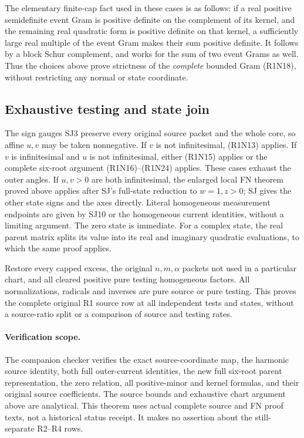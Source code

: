 The elementary finite-cap fact used in these cases is as follows:
if a real positive semidefinite event Gram is positive definite on
the complement of its kernel, and the remaining real quadratic
form is positive definite on that kernel, a sufficiently large
real multiple of the event Gram makes their sum positive definite.
It follows by a block Schur complement, and works for the sum of
two event Grams as well.  Thus the choices above prove strictness
of the \emph{complete} bounded Gram (R1N18), without restricting
any normal or state coordinate.

\subsection{Exhaustive testing and state join}

The sign gauges SJ3 preserve every original source packet and the
whole core, so affine $u,v$ may be taken nonnegative.
If $v$ is not infinitesimal, (R1N13) applies.
If $v$ is infinitesimal and $u$ is not infinitesimal, either
(R1N15) applies or the complete six-root argument
(R1N16)--(R1N24) applies.  These cases exhaust the outer angles.
If $u,v>0$ are both infinitesimal, the enlarged local FN theorem
proved above applies after SJ's full-state reduction to $w=1,z>0$;
SJ gives the other state signs and the axes directly.
Literal homogeneous measurement endpoints are given by SJ10 or
the homogeneous current identities, without a limiting argument.
The zero state is immediate.  For a complex state, the real
parent matrix splits its value into its real and imaginary
quadratic evaluations, to which the same proof applies.

Restore every capped excess, the original $n,m,\alpha$ packets
not used in a particular chart, and all cleared positive pure
testing homogeneous factors.  All normalizations, radicals and
inverses are pure source or pure testing.  This proves the
complete original R1 source row at all independent tests and
states, without a source-ratio split or a comparison of source
and testing rates.

\paragraph{Verification scope.}
The companion checker verifies the exact source-coordinate map,
the harmonic source identity, both full outer-current identities,
the new full six-root parent representation, the zero relation,
all positive-minor and kernel formulas, and their original
source coefficients.  The source bounds and exhaustive chart
argument above are analytical.  This theorem uses actual complete
source and FN proof texts, not a historical status receipt.
It makes no assertion about the still-separate R2--R4 rows.

